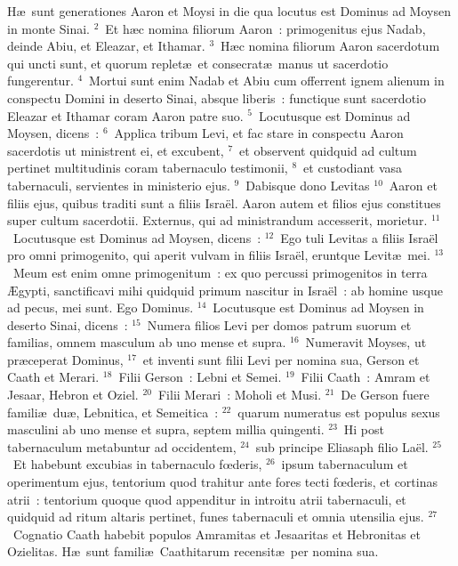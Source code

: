 \lettrine[lines=3,image=true,loversize=0.05,lraise=-0.03]{H}{}\ae\ sunt generationes Aaron et Moysi in die qua locutus est Dominus ad Moysen in monte Sinai.
${}^{2}$~Et h\ae c nomina filiorum Aaron~: primogenitus ejus Nadab, deinde Abiu, et Eleazar, et Ithamar.
${}^{3}$~H\ae c nomina filiorum Aaron sacerdotum qui uncti sunt, et quorum replet\ae\ et consecrat\ae\ manus ut sacerdotio fungerentur.
${}^{4}$~Mortui sunt enim Nadab et Abiu cum offerrent ignem alienum in conspectu Domini in deserto Sinai, absque liberis~: functique sunt sacerdotio Eleazar et Ithamar coram Aaron patre suo.
${}^{5}$~Locutusque est Dominus ad Moysen, dicens~:
${}^{6}$~Applica tribum Levi, et fac stare in conspectu Aaron sacerdotis ut ministrent ei, et excubent,
${}^{7}$~et observent quidquid ad cultum pertinet multitudinis coram tabernaculo testimonii,
${}^{8}$~et custodiant vasa tabernaculi, servientes in ministerio ejus.
${}^{9}$~Dabisque dono Levitas
${}^{10}$~Aaron et filiis ejus, quibus traditi sunt a filiis Isra\"el. Aaron autem et filios ejus constitues super cultum sacerdotii. Externus, qui ad ministrandum accesserit, morietur.
${}^{11}$~Locutusque est Dominus ad Moysen, dicens~:
${}^{12}$~Ego tuli Levitas a filiis Isra\"el pro omni primogenito, qui aperit vulvam in filiis Isra\"el, eruntque Levit\ae\ mei.
${}^{13}$~Meum est enim omne primogenitum~: ex quo percussi primogenitos in terra \AE gypti, sanctificavi mihi quidquid primum nascitur in Isra\"el~: ab homine usque ad pecus, mei sunt. Ego Dominus.
${}^{14}$~Locutusque est Dominus ad Moysen in deserto Sinai, dicens~:
${}^{15}$~Numera filios Levi per domos patrum suorum et familias, omnem masculum ab uno mense et supra.
${}^{16}$~Numeravit Moyses, ut pr\ae ceperat Dominus,
${}^{17}$~et inventi sunt filii Levi per nomina sua, Gerson et Caath et Merari.
${}^{18}$~Filii Gerson~: Lebni et Semei.
${}^{19}$~Filii Caath~: Amram et Jesaar, Hebron et Oziel.
${}^{20}$~Filii Merari~: Moholi et Musi.
${}^{21}$~De Gerson fuere famili\ae\ du\ae , Lebnitica, et Semeitica~:
${}^{22}$~quarum numeratus est populus sexus masculini ab uno mense et supra, septem millia quingenti.
${}^{23}$~Hi post tabernaculum metabuntur ad occidentem,
${}^{24}$~sub principe Eliasaph filio La\"el.
${}^{25}$~Et habebunt excubias in tabernaculo fœderis,
${}^{26}$~ipsum tabernaculum et operimentum ejus, tentorium quod trahitur ante fores tecti fœderis, et cortinas atrii~: tentorium quoque quod appenditur in introitu atrii tabernaculi, et quidquid ad ritum altaris pertinet, funes tabernaculi et omnia utensilia ejus.
${}^{27}$~Cognatio Caath habebit populos Amramitas et Jesaaritas et Hebronitas et Ozielitas. H\ae\ sunt famili\ae\ Caathitarum recensit\ae\ per nomina sua.
